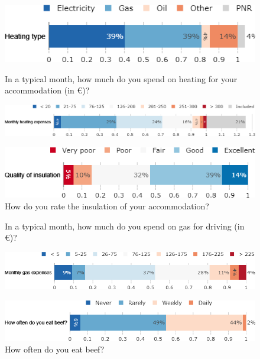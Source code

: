 \begin{framefont}{\small}
\begin{frame}{}
\begin{figure}[h!]
\centering
\includegraphics[width=.43\paperwidth]{../figures/FR/heating_FR.png} \\
\vspace{.5cm}
\caption{In a typical month, how much do you spend on heating for your accommodation (in \euro{})?}
\includegraphics[width=.61\paperwidth]{../figures/FR/heating_expenses_FR.png} \\
\vspace{.5cm}
\centering
\caption{How do you rate the insulation of your accommodation?}
\includegraphics[width=.52\paperwidth]{../figures/FR/insulation_FR.png}
\end{figure}
\end{frame}

\begin{frame}{}%
\begin{figure}[h!]
\centering
\caption{In a typical month, how much do you spend on gas for driving (in \euro{})?}
\includegraphics[width=.52\paperwidth]{../figures/FR/gas_expenses_FR.png} \\
\vspace{.5cm}
\vspace{.5cm}
\caption{How often do you eat beef?}
\includegraphics[width=.61\paperwidth]{../figures/FR/frequency_beef_FR.png}
\end{figure}
\end{frame}

\end{framefont}



